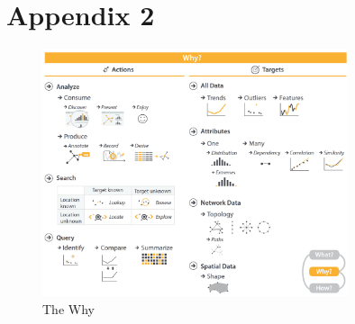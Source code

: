 \section{Appendix 2} \label{app:www-why}

\begin{figure}[h]
  \centering
  \includegraphics[width=0.8\textwidth]{Images/www/why.png}
  \caption{The Why}
  \label{fig:www-what}
\end{figure}

\newpage